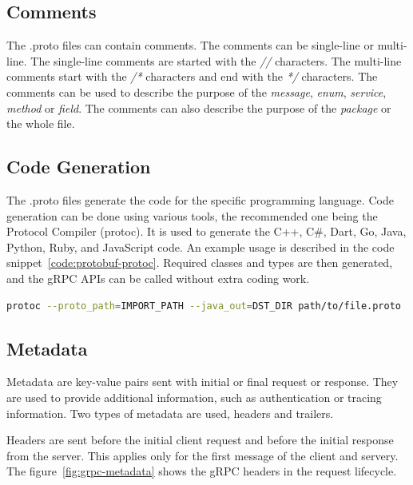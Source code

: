 \subsection{Comments}
The .proto files can contain comments.
The comments can be single-line or multi-line.
The single-line comments are started with the \textit{//} characters.
The multi-line comments start with the \textit{/*} characters and end with the \textit{*/} characters.
The comments can be used to describe the purpose of the \textit{message}, \textit{enum}, \textit{service}, \textit{method} or \textit{field}.
The comments can also describe the purpose of the \textit{package} or the whole file.
\cite{protobuf-proto3}

\subsection{Code Generation}
The .proto files generate the code for the specific programming language.
Code generation can be done using various tools, the recommended one being the Protocol Compiler (protoc).
It is used to generate the C++, C\#, Dart, Go, Java, Python, Ruby, and JavaScript code.
An example usage is described in the code snippet~\ref{code:protobuf-protoc}.
Required classes and types are then generated, and the gRPC APIs can be called without extra coding work.
\cite{protobuf-proto3}

\begin{lstlisting}[language=bash, caption={Protocol Buffers Code Generation~\cite{protobuf-proto3}}, label={code:protobuf-protoc}]
protoc --proto_path=IMPORT_PATH --java_out=DST_DIR path/to/file.proto
\end{lstlisting}

\subsection{Metadata}
Metadata are key-value pairs sent with initial or final request or response.
They are used to provide additional information, such as authentication or tracing information.
Two types of metadata are used, headers and trailers.

Headers are sent before the initial client request and before the initial response from the server.
This applies only for the first message of the client and servery.
The figure~\ref{fig:grpc-metadata} shows the gRPC headers in the request lifecycle.


